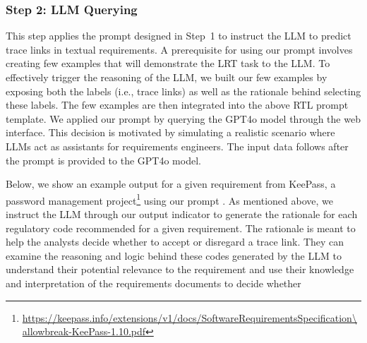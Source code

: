 


\subsubsection*{Step 2: LLM Querying}\label{subsec:LLMQuerying}
This step applies the prompt designed in Step~1 to instruct the LLM to predict trace links in textual requirements. 
%
A prerequisite for using our prompt involves creating few examples that will demonstrate the LRT task to the LLM. To effectively trigger the reasoning of the LLM, we built our few examples by exposing both the labels (i.e., trace links) as well as the rationale behind selecting these labels. The few examples are then integrated into the above RTL prompt template. We applied our prompt by querying the GPT4o model through the web interface. This decision is motivated by simulating a realistic scenario where LLMs act as assistants for requirements engineers. The input data follows after the prompt is provided to the GPT4o model.

Below, we show an example output for a given requirement from  KeePass, a password management   project\footnote{\url{https://keepass.info/extensions/v1/docs/SoftwareRequirementsSpecification\allowbreak-KeePass-1.10.pdf}} using our prompt . As mentioned above, {we instruct the LLM through our output indicator to generate the rationale for each regulatory code recommended for a given requirement.} The rationale is meant to help the analysts decide whether to accept or disregard a trace link. %
They can examine the reasoning and logic behind these codes generated by the LLM to understand their potential relevance to the requirement and use their knowledge and interpretation of the requirements documents to decide whether 


